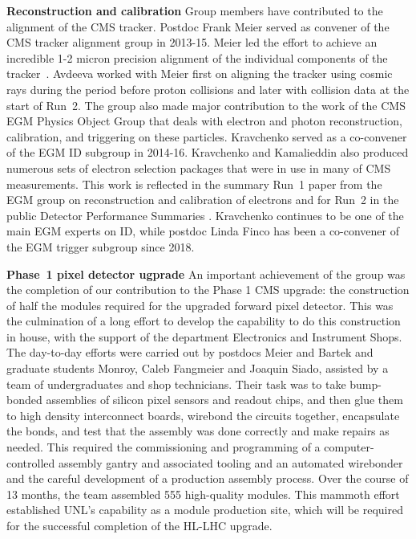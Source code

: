 {\bf Reconstruction and calibration}
Group members have contributed to the alignment of the CMS tracker.  Postdoc Frank Meier served as convener of the CMS tracker alignment group in 2013-15.  Meier led the effort to achieve an incredible 1-2 micron precision alignment of the individual components of the  tracker~\cite{bib:alignment}.  Avdeeva worked with Meier first on aligning the tracker using cosmic rays during the period before proton collisions and later with collision data at the start of Run~2. The group also made major contribution to the work of the CMS EGM Physics Object Group that deals with electron and photon reconstruction, calibration, and triggering on these particles. Kravchenko served as a co-convener of the EGM ID subgroup in 2014-16. Kravchenko and Kamalieddin also produced numerous sets of electron selection packages that were in use in many of CMS measurements. This work is reflected in the summary Run~1 paper from the EGM group on reconstruction and calibration of electrons \cite{bib:EGM-Run1} and for Run~2 in the public Detector Performance Summaries \cite{bib:EGM-Run2-DP}. Kravchenko continues to be one of the main EGM experts on ID, while postdoc Linda Finco has been a co-convener of the EGM trigger subgroup since 2018.

{\bf Phase~1 pixel detector ugprade}
An important achievement of the group was the completion of our contribution to the Phase 1 CMS upgrade: the construction of half the modules required for the upgraded forward pixel detector.  This was the culmination of a long effort to develop the capability to do this construction in house, with the support of the department Electronics and Instrument Shops.  The day-to-day efforts were carried out by postdocs Meier and Bartek and graduate students Monroy, Caleb Fangmeier and Joaquin Siado, assisted by a team of undergraduates and shop technicians.  Their task was to take bump-bonded assemblies of silicon pixel sensors and readout chips, and then glue them to high density interconnect boards, wirebond the circuits together, encapsulate the bonds, and test that the assembly was done correctly and make repairs as needed.  This required the commissioning and programming of a computer-controlled assembly gantry and associated tooling and an automated wirebonder and the careful development of a production assembly process.  Over the course of 13 months, the team assembled 555 high-quality modules.
This mammoth effort established UNL's capability as a module production site, which will be required for the successful completion of the HL-LHC upgrade.

